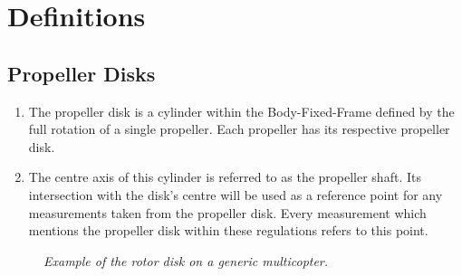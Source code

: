 \documentclass{article}
\begin{document}
\newpage
\section{Definitions}
\subsection{Propeller Disks}
\begin{enumerate}
  \item The propeller disk is a cylinder within the Body-Fixed-Frame defined by the full rotation of a single propeller. Each propeller has its respective propeller disk. 
  \item The centre axis of this cylinder is referred to as the propeller shaft. Its intersection with the disk's centre will be used as a reference point for any measurements taken from the propeller disk. Every measurement which mentions the propeller disk within these regulations refers to this point.
\end{enumerate}

\begin{figure}[h!]
  \centering
 \caption{\textit{Example of the rotor disk on a generic multicopter.}}
 \end{figure}
\end{document}
